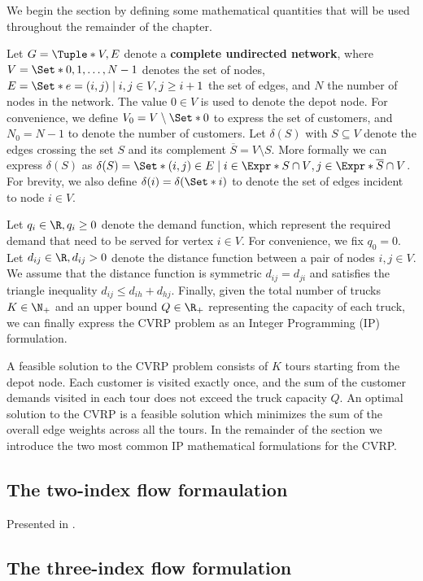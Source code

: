 We begin the section by defining some mathematical quantities that will be used throughout
the remainder of the chapter.

\medskip

Let $G = \Tuple*{V, E}$ denote a \textbf{complete undirected network}, where $V = \Set*{0, 1, \dots, N - 1}$ denotes the set of nodes,
$E = \Set*{e = (i, j) \mid \allowbreak i,j \in V, \allowbreak  j \ge i + 1}$ the set of edges, and $N$ the number of nodes in the network.
The value $0 \in V$ is used to denote the depot node.
For convenience, we define $V_0 = V \setminus \Set*{0}$ to express the set of customers, and $N_0 = N - 1$ to denote the number of customers.
Let $\delta(S)$ with $S \subseteq V$ denote the edges crossing the set $S$ and its complement $\overline{S} = V \setminus S$.
More formally we can express $\delta(S)$ as $\delta(S) = \Set*{ (i, j) \in E \mid i \in \Expr*{S \cap V}, j \in \Expr*{ \overline{S} \cap V } }$.
For brevity, we also define $\delta(i) = \delta(\Set*{i})$ to denote the set of edges incident to node $i \in V$.

Let $q_{i} \in \R, q_{i} \ge 0$ denote the demand function, which represent the required demand that need to be served for vertex $i \in V$.
For convenience, we fix $q_0 = 0$.
Let $d_{ij} \in \R, d_{ij} > 0$ denote the distance function between a pair of nodes  $i, j \in V$.
We assume that the distance function is symmetric $d_{ij} = d_{ji}$ and satisfies the triangle inequality $d_{ij} \le d_{ih} + d_{hj}$.
Finally, given the total number of trucks $K \in \N_+$ and an upper bound $Q \in \R_+$ representing the capacity of each truck, we can finally express the CVRP problem as an Integer Programming (IP) formulation.

A feasible solution to the CVRP problem consists of $K$ tours starting from the depot node.
Each customer is visited exactly once, and the sum of the customer demands visited in each tour does not exceed the truck capacity $Q$.
An optimal solution to the CVRP is a feasible solution which minimizes the sum of the overall edge weights across all the tours.
In the remainder of the section we introduce the two most common IP mathematical formulations for the CVRP.


\subsection{The two-index flow formaulation}
Presented in \cite{laporte1983, laporte1985}.

\subsection{The three-index flow formulation}
\label{sec:intro-cvrp-three-index-flow-formulation}

